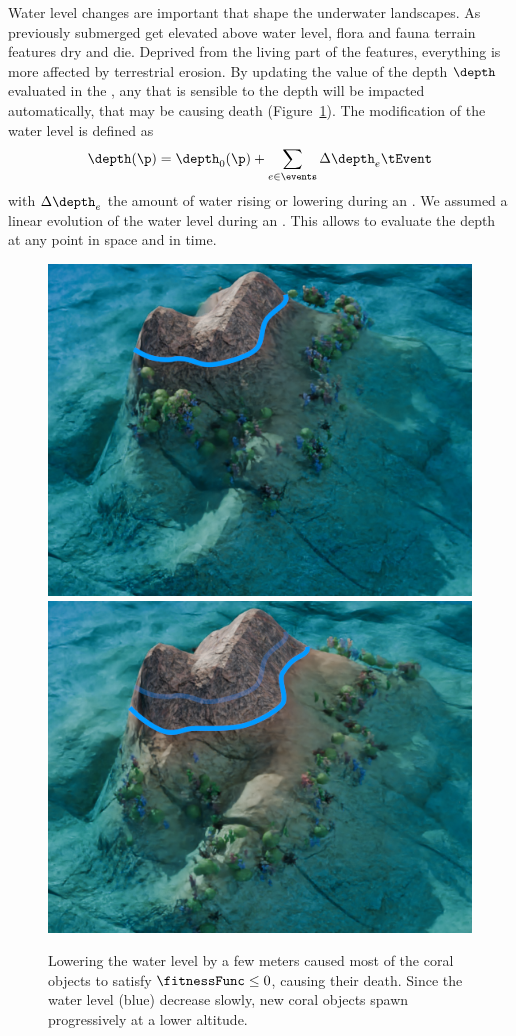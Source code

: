 Water level changes are important  that shape the underwater landscapes. As previously submerged  get elevated above water level, flora and fauna terrain features dry and die. Deprived from the living part of the features, everything is more affected by terrestrial erosion. By updating the value of the depth $\depth$ evaluated in the , any  that is sensible to the depth will be impacted automatically, that may be causing death (Figure~\ref{fig:semantic-representation_water-event}). The modification of the water level is defined as 
\begin{align*}
    \depth(\p) = \depth_0(\p) + \sum_{e \in \events} \Delta \depth_e \tEvent
\end{align*}
with $\Delta \depth_e$ the amount of water rising or lowering during an . We assumed a linear evolution of the water level during an . This allows to evaluate the depth at any point in space and in time.

\begin{figure}
    \includegraphics[width = 0.45 \linewidth]{Figures/Interactions/InteractionWater1.png}
    \includegraphics[width = 0.45 \linewidth]{Figures/Interactions/InteractionWater3.png}
    \caption{Lowering the water level by a few meters caused most of the coral objects to satisfy $\fitnessFunc \leq 0$, causing their death. Since the water level (blue) decrease slowly, new coral objects spawn progressively at a lower altitude.}
    \label{fig:semantic-representation_water-event}
\end{figure}

